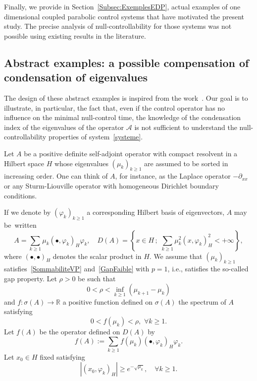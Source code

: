 \documentclass[AHL,Unicode,longabstracts]{cedram}
\newcommand\A{\mathcal{A}}
\newcommand{\psH}[2]{\left(#1, #2 \right)_H}
\renewcommand{\cdot}{{\scriptstyle \bullet}}
\let\oldforall\forall
\renewcommand*{\forall}{\mathrel{\oldforall}}
\begin{document}
Finally, we provide in Section~\ref{Subsec:ExemplesEDP}, actual examples of one dimensional coupled parabolic control systems that have motivated the present study. The precise analysis of null-controllability for those systems was not possible using existing results in the literature.


\subsection{Abstract examples: a possible compensation of condensation of eigenvalues} \label{Subsec:ExemplesAcademiques}

The design of these abstract examples is inspired from the work~\cite{AKBDK05}. Our goal is to illustrate, in particular, the fact that, even if the control operator has no influence on the minimal null-control time, the knowledge of the condensation index of the eigenvalues of the operator $\A$ is not sufficient to understand the null-controllability properties of system~\eqref{systeme}.

Let $A$ be a positive definite self-adjoint operator with compact resolvent in a Hilbert space $H$ whose eigenvalues $(\mu _{k})_{k \geq 1}$ are assumed to be sorted in increasing order. One can think of $A$, for instance, as the Laplace operator $-\partial_{xx} $ or any Sturm-Liouville operator with homogeneous Dirichlet boundary conditions.

If we denote by $(\varphi _{k})_{k \geq 1}$ a corresponding Hilbert basis of eigenvectors, $A$ may be~written
\begin{equation*}
A=\sum_{k \geq 1} \mu_{k} \psH{\cdot}{\varphi_{k}} \varphi_{k}, \quad D(A)=\left\{x\in H \,;\,\, \sum_{k\geq 1}\mu_k^2 \psH{x}{\varphi_k}^2<+\infty\right\},
\end{equation*}
where $\psH{\cdot}{\cdot}$ denotes the scalar product in $H$. We assume that $(\mu_k)_{k \geq 1}$ satisfies~\eqref{SommabiliteVP} and~\eqref{GapFaible} with $p=1$, i.e., satisfies the so-called gap property. Let $\rho >0$ be such that
\begin{equation}\label{hyporho}
0 < \rho < \inf_{k \geq 1} (\mu_{k+1}- \mu_k)
\end{equation}
and $f:\sigma(A)\rightarrow \mathbb{R}$ a positive function defined on $\sigma(A)$ the spectrum of $A$ satisfying
\begin{equation}\label{hypof}
0<f(\mu_k)<\rho, \,\,\forall k\geq 1.
\end{equation}
Let $f(A)$ be the operator defined on $D(A)$ by
\begin{equation*}
f(A):=\sum_{k\geq 1}f(\mu _{k}) \psH{\cdot}{\varphi _{k} } \varphi _{k}.
\end{equation*}
Let $x_0\in H$ fixed satisfying
\begin{equation}\label{hypox0}
| \psH{x_0}{\varphi_k}| \geq e^{-\sqrt{\mu_k}},\quad \forall k\geq 1.
\end{equation}
\end{document}
